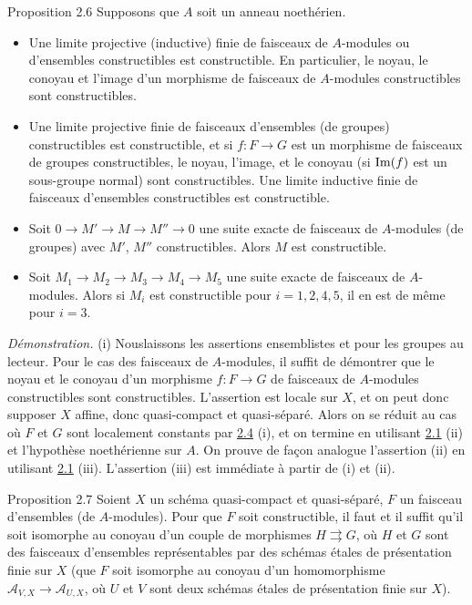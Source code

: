 \documentclass[10pt]{../fichiers-configuration-latex/smfart}
\begin{document}
\begin{enonce*}{Proposition 2.6}
Supposons que $A$ soit un anneau noethérien.
\begin{itemize}
\item[(i)] Une limite projective (\resp inductive) finie de faisceaux de
  $A$-modules ou d'ensembles constructibles est constructible. En
  particulier, le noyau, le conoyau et l'image d'un morphisme de
  faisceaux de $A$-modules constructibles sont constructibles.

\item[(i bis)] Une limite projective finie de faisceaux d'ensembles
  (\resp de groupes) constructibles est constructible, et si
  $f:F\rightarrow G$ est un morphisme de faisceaux de groupes
  constructibles, le noyau, l'image, et le conoyau (si $\operatorname{Im}(f)$ est un
  sous-groupe normal) sont constructibles. Une limite inductive finie
  de faisceaux d'ensembles constructibles est constructible.

\item[(ii)] Soit $0\rightarrow M'\rightarrow M\rightarrow M''\rightarrow 0$
  une suite exacte de faisceaux de $A$-modules (\resp de groupes) avec
  $M'$, $M''$ constructibles. Alors $M$ est constructible.

\item[(iii)] Soit $M_1\rightarrow M_2\rightarrow M_3\rightarrow
  M_4\rightarrow M_5$ une suite exacte de faisceaux de
  $A$-modules. Alors si $M_i$ est constructible pour $i=1,2,4,5$, il
  en est de même pour $i=3$.
\end{itemize}
\end{enonce*}

\emph{Démonstration.} (i) Nous\pageoriginale laissons les assertions
ensemblistes et pour les groupes au lecteur. Pour le cas des faisceaux
de $A$-modules, il suffit de démontrer que le noyau et le conoyau d'un
morphisme $f:F\rightarrow G$ de faisceaux de $A$-modules
constructibles sont constructibles. L'assertion est locale sur $X$, et
on peut donc supposer $X$ affine, donc quasi-compact et
quasi-séparé. Alors on se réduit au cas où $F$ et $G$ sont localement
constants par \hyperref[IX.prop2.4]{2.4} (i), et on termine en utilisant \hyperref[IX.lem2.1]{2.1} (ii) et
l'hypothèse noethérienne sur $A$. On prouve de façon analogue
l'assertion (ii) en utilisant \hyperref[IX.lem2.1]{2.1} (iii). L'assertion (iii) est
immédiate à partir de (i) et (ii).

\begin{enonce*}{Proposition 2.7}
Soient $X$ un schéma quasi-compact et quasi-séparé, $F$ un faisceau
d'ensembles (\resp de $A$-modules). Pour que $F$ soit constructible,
il faut et il suffit qu'il soit isomorphe au conoyau d'un couple de
morphismes $H\rightrightarrows G$, où $H$ et $G$ sont des faisceaux
d'ensembles représentables par des schémas étales de présentation
finie sur $X$ (\resp que $F$ soit isomorphe au conoyau d'un
homomorphisme $𝒜_{V,X}\rightarrow 𝒜_{U,X}$, où $U$ et $V$ sont
deux schémas étales de présentation finie sur $X$).
\end{enonce*}
\end{document}

